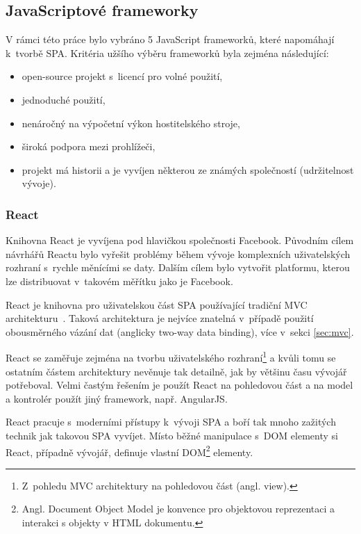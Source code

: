 \subsection{JavaScriptové frameworky}

V rámci této práce bylo vybráno 5 JavaScript frameworků, které napomáhají k~tvorbě SPA. Kritéria užšího výběru frameworků byla zejména následující:

\begin{itemize}  
\item open-source projekt s~licencí pro volné použití,
\item jednoduché použití,
\item nenáročný na výpočetní výkon hostitelského stroje,
\item široká podpora mezi prohlížeči,
\item projekt má historii a je vyvíjen některou ze známých společností (udržitelnost vývoje).
\end{itemize}

\subsubsection*{React~\cite{react}}
Knihovna React je vyvíjena pod hlavičkou společnosti Facebook. Původním cílem návrhářů Reactu bylo vyřešit problémy během vývoje komplexních uživatelských rozhraní s~rychle měnícími se daty. Dalším cílem bylo vytvořit platformu, kterou lze distribuovat v~takovém měřítku jako je Facebook.

React je knihovna pro uživatelskou část SPA používající tradiční MVC architekturu~\cite{mvc}. Taková architektura je nejvíce znatelná v~případě použití obousměrného vázání dat (anglicky two-way data binding), více v~sekci \ref{sec:mvc}.

React se zaměřuje zejména na tvorbu uživatelského rozhraní\footnote{Z~pohledu MVC architektury na pohledovou část (angl. view).} a kvůli tomu se ostatním částem architektury nevěnuje tak detailně, jak by většinu času vývojář potřeboval. Velmi častým řešením je použít React na pohledovou část a na model a kontrolér použít jiný framework, např. AngularJS.

React pracuje s~moderními přístupy k~vývoji SPA a boří tak mnoho zažitých technik jak takovou SPA vyvíjet. Místo běžné manipulace s~DOM elementy si React, případně vývojář, definuje vlastní DOM\footnote{Angl. Document Object Model je konvence pro objektovou reprezentaci a interakci s objekty v HTML dokumentu.} elementy.

